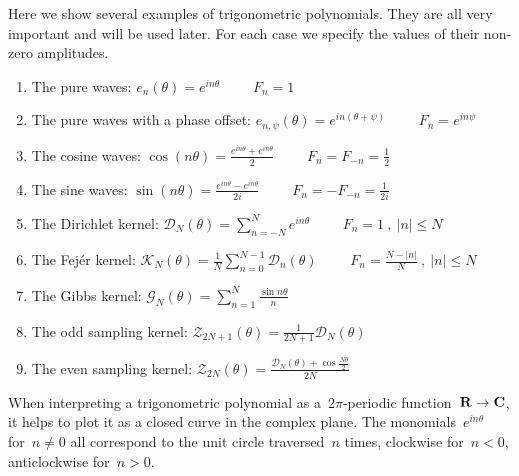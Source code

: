 \begin{definition}
	Here we show several examples of trigonometric polynomials.  They are
	all very important and will be used later.  For each case we specify
	the values of their non-zero amplitudes.
\begin{enumerate}
	\item The pure waves: $e_n(\theta)=e^{in\theta}$
		$\qquad F_n=1$
	\item The pure waves with a phase offset:
		$e_{n,\psi}(\theta)=e^{in(\theta+\psi)}$
		$\qquad F_n=e^{in\psi}$
	\item The cosine waves:
		$\cos(n\theta)=\displaystyle\frac{e^{in\theta}+e^{in\theta}}{2}$
		$\qquad F_n=F_{-n}=\frac{1}{2}$
	\item The sine waves:
		$\sin(n\theta)=\displaystyle\frac{e^{in\theta}-e^{in\theta}}{2i}$
		$\qquad F_n=-F_{-n}=\frac{1}{2i}$
	\item The Dirichlet kernel:
		$\mathcal{D}_N(\theta)=\displaystyle\sum_{n=-N}^Ne^{in\theta}$
		$\qquad F_n=1\ ,\ |n|\le N$
	\item The Fejér kernel:
		$\mathcal{K}_N(\theta)
		=\displaystyle\frac{1}{N}\sum_{n=0}^{N-1}\mathcal{D}_n(\theta)
		$%
		$\qquad F_n=\frac{N-|n|}{N}\ ,\ |n|\le N$
	\item The Gibbs kernel:
		$\mathcal{G}_N(\theta)
		=\displaystyle\sum_{n=1}^{N}\frac{\sin n\theta}{n}$
	\item The odd sampling kernel:
		$\mathcal{Z}_{2N+1}(\theta)=\frac{1}{2N+1}\mathcal{D}_N(\theta)$
	\item The even sampling kernel:
		$\mathcal{Z}_{2N}(\theta)=\frac{\mathcal{D}_N(\theta)+\cos\frac{N\theta}{2}}{2N}$
\end{enumerate}
\end{definition}


When interpreting a trigonometric polynomial as a~$2\pi$-periodic
function~$\mathbf{R}\to\mathbf{C}$, it helps to plot it as a closed curve in the complex
plane.  The monomials~$e^{in\theta}$ for~$n\neq 0$ all correspond to the unit
circle traversed~$n$ times, clockwise for~$n<0$, anticlockwise for~$n>0$.

